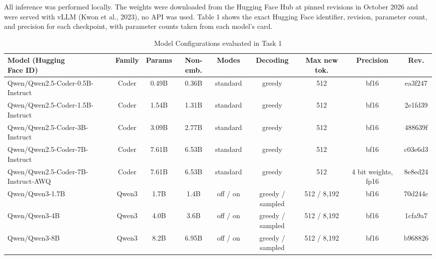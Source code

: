 All inference was performed locally. The weights were downloaded from the Hugging Face Hub at pinned revisions in October 2026 and were served with vLLM (Kwon et al., 2023), no API was used. Table 1 shows the exact Hugging Face identifier, revision, parameter count, and precision for each checkpoint, with parameter counts taken from each model's card.

\begin{table}[!htbp]
\centering
\caption{Model Configurations evaluated in Task 1}
\label{tab:1}
\small
\begin{adjustbox}{max width=\linewidth}
\begin{tabular}{@{}lcccccccc@{}}
\toprule
\makecell{Model (Hugging \\ {}Face ID)} & Family & Params & Non-emb. & Modes & Decoding & Max new tok. & Precision & Rev. \\
\midrule
Qwen/Qwen2.5-Coder-0.5B-Instruct & Coder & 0.49B & 0.36B & standard & greedy & 512 & bf16 & ea3f247 \\
Qwen/Qwen2.5-Coder-1.5B-Instruct & Coder & 1.54B & 1.31B & standard & greedy & 512 & bf16 & 2e1fd39 \\
Qwen/Qwen2.5-Coder-3B-Instruct & Coder & 3.09B & 2.77B & standard & greedy & 512 & bf16 & 488639f \\
Qwen/Qwen2.5-Coder-7B-Instruct & Coder & 7.61B & 6.53B & standard & greedy & 512 & bf16 & c03e6d3 \\
Qwen/Qwen2.5-Coder-7B-Instruct-AWQ & Coder & 7.61B & 6.53B & standard & greedy & 512 & 4 bit weights, fp16 & 8e8ed24 \\
Qwen/Qwen3-1.7B & Qwen3 & 1.7B & 1.4B & off / on & greedy / sampled & 512 / 8,192 & bf16 & 70d244c \\
Qwen/Qwen3-4B & Qwen3 & 4.0B & 3.6B & off / on & greedy / sampled & 512 / 8,192 & bf16 & 1cfa9a7 \\
Qwen/Qwen3-8B & Qwen3 & 8.2B & 6.95B & off / on & greedy / sampled & 512 / 8,192 & bf16 & b968826 \\
\bottomrule
\end{tabular}
\end{adjustbox}
\par{}
\end{table}

